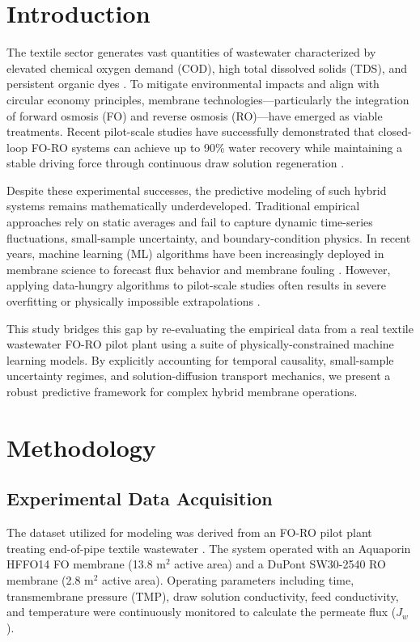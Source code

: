 \documentclass[journal, onecolumn, 12pt]{IEEEtran}
\begin{document}
\section{Introduction}
The textile sector generates vast quantities of wastewater characterized by elevated chemical oxygen demand (COD), high total dissolved solids (TDS), and persistent organic dyes \cite{b1}. To mitigate environmental impacts and align with circular economy principles, membrane technologies---particularly the integration of forward osmosis (FO) and reverse osmosis (RO)---have emerged as viable treatments. Recent pilot-scale studies have successfully demonstrated that closed-loop FO-RO systems can achieve up to 90\% water recovery while maintaining a stable driving force through continuous draw solution regeneration \cite{b1}.

Despite these experimental successes, the predictive modeling of such hybrid systems remains mathematically underdeveloped. Traditional empirical approaches rely on static averages and fail to capture dynamic time-series fluctuations, small-sample uncertainty, and boundary-condition physics. In recent years, machine learning (ML) algorithms have been increasingly deployed in membrane science to forecast flux behavior and membrane fouling \cite{b2, b4}. However, applying data-hungry algorithms to pilot-scale studies often results in severe overfitting or physically impossible extrapolations \cite{b3}.

This study bridges this gap by re-evaluating the empirical data from a real textile wastewater FO-RO pilot plant using a suite of physically-constrained machine learning models. By explicitly accounting for temporal causality, small-sample uncertainty regimes, and solution-diffusion transport mechanics, we present a robust predictive framework for complex hybrid membrane operations.

\section{Methodology}

\subsection{Experimental Data Acquisition}
The dataset utilized for modeling was derived from an FO-RO pilot plant treating end-of-pipe textile wastewater \cite{b1}. The system operated with an Aquaporin HFFO14 FO membrane (13.8 m$^2$ active area) and a DuPont SW30-2540 RO membrane (2.8 m$^2$ active area). Operating parameters including time, transmembrane pressure (TMP), draw solution conductivity, feed conductivity, and temperature were continuously monitored to calculate the permeate flux ($J_w$).
\end{document}
